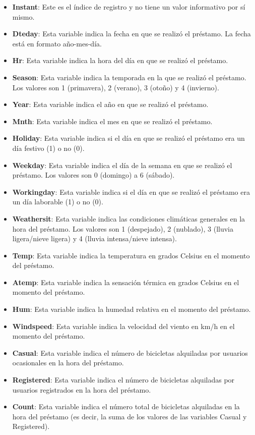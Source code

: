 \documentclass{wsdcr}
\begin{document}
\begin{itemize}
    \item \textbf{Instant}: Este es el índice de registro y no tiene un valor informativo por sí mismo.
    \item \textbf{Dteday}: Esta variable indica la fecha en que se realizó el préstamo. La fecha está en formato año-mes-día.
    \item \textbf{Hr}: Esta variable indica la hora del día en que se realizó el préstamo.
    \item \textbf{Season}: Esta variable indica la temporada en la que se realizó el préstamo. Los valores son 1 (primavera), 2 (verano), 3 (otoño) y 4 (invierno).
    \item \textbf{Year}: Esta variable indica el año en que se realizó el préstamo.
    \item \textbf{Mnth}: Esta variable indica el mes en que se realizó el préstamo.
    \item \textbf{Holiday}: Esta variable indica si el día en que se realizó el préstamo era un día festivo (1) o no (0).
    \item \textbf{Weekday}: Esta variable indica el día de la semana en que se realizó el préstamo. Los valores son 0 (domingo) a 6 (sábado).
    \item \textbf{Workingday}: Esta variable indica si el día en que se realizó el préstamo era un día laborable (1) o no (0).
    \item \textbf{Weathersit}: Esta variable indica las condiciones climáticas generales en la hora del préstamo. Los valores son 1 (despejado), 2 (nublado), 3 (lluvia ligera/nieve ligera) y 4 (lluvia intensa/nieve intensa).
    \item \textbf{Temp}: Esta variable indica la temperatura en grados Celsius en el momento del préstamo.
    \item \textbf{Atemp}: Esta variable indica la sensación térmica en grados Celsius en el momento del préstamo.
    \item \textbf{Hum}: Esta variable indica la humedad relativa en el momento del préstamo.
    \item \textbf{Windspeed}: Esta variable indica la velocidad del viento en km/h en el momento del préstamo.
    \item \textbf{Casual}: Esta variable indica el número de bicicletas alquiladas por usuarios ocasionales en la hora del préstamo.
    \item \textbf{Registered}: Esta variable indica el número de bicicletas alquiladas por usuarios registrados en la hora del préstamo.
    \item \textbf{Count}: Esta variable indica el número total de bicicletas alquiladas en la hora del préstamo (es decir, la suma de los valores de las variables Casual y Registered).
\end{itemize}
\end{document}
